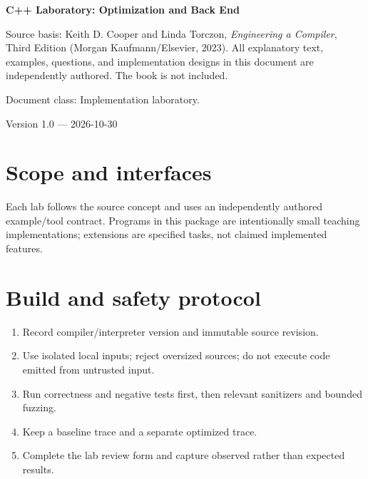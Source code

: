 \documentclass[10pt,letterpaper]{article}
\begin{document}
\begin{titlepage}
\centering\vspace*{1.0in}
{\Huge\bfseries\textcolor{CompilerBlue}{C++ Laboratory: Optimization and Back End}\par}
\vspace{.22in}{\Large Executable reference kernels plus guided extensions\par}
\vspace{.4in}{\large Compiler Engineering Documentation Suite\par}
\vfill
\begin{minipage}{.86\linewidth}\small
Source basis: Keith D. Cooper and Linda Torczon, \emph{Engineering a Compiler}, Third Edition (Morgan Kaufmann/Elsevier, 2023). All explanatory text, examples, questions, and implementation designs in this document are independently authored. The book is not included.\par\medskip
Document class: Implementation laboratory.
\end{minipage}
\vfill\textcolor{CompilerGray}{Version 1.0 --- 2026-10-30}\par
\end{titlepage}
\tableofcontents\clearpage
\section{Scope and interfaces}
Each lab follows the source concept and uses an independently authored example/tool contract. Programs in this package are intentionally small teaching implementations; extensions are specified tasks, not claimed implemented features.

\section{Build and safety protocol}
\begin{enumerate}
\item Record compiler/interpreter version and immutable source revision.
\item Use isolated local inputs; reject oversized sources; do not execute code emitted from untrusted input.
\item Run correctness and negative tests first, then relevant sanitizers and bounded fuzzing.
\item Keep a baseline trace and a separate optimized trace.
\item Complete the lab review form and capture observed rather than expected results.
\end{enumerate}
\end{document}
